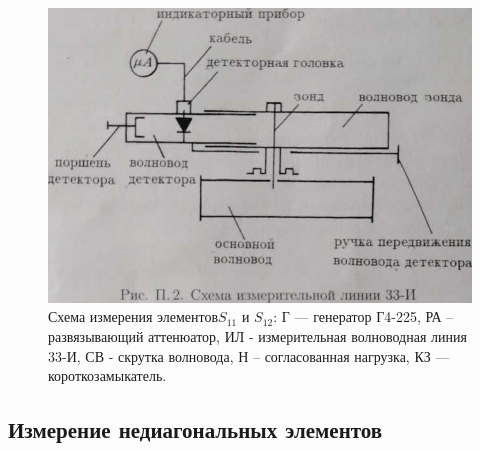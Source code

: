 ﻿\documentclass[a4paper,11pt]{article}
\begin{document}
\begin{figure}[h!]
	\centering
	\includegraphics[]{img/3.jpg}
	\caption{Схема измерения элементов$ S_{11}$ и $S_{12}$:  Г --- генератор Г4-225, РА  -- развязывающий аттенюатор, ИЛ - измерительная волноводная линия 33-И, СВ - скрутка волновода,  Н -- согласованная нагрузка, КЗ --- короткозамыкатель.}
	\label{fig:fig3}
\end{figure}


\subsection{Измерение недиагональных элементов}
\end{document}
